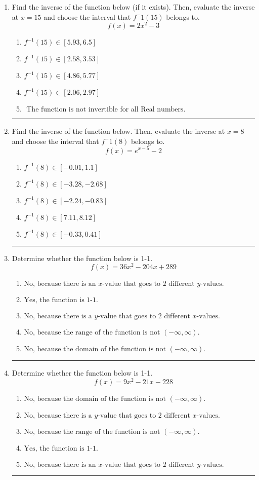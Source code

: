 \documentclass[14pt]{extbook}
\newcommand{\litem}[1]{\item#1\hspace*{-1cm}\rule{\textwidth}{0.4pt}}
\begin{document}
\begin{enumerate}
{\begin{enumerate}[label=\Alph*.]
\end{enumerate} }
\litem{
Find the inverse of the function below (if it exists). Then, evaluate the inverse at $x = 15$ and choose the interval that $f^-1(15)$ belongs to.\[ f(x) = 2 x^2 - 3 \]\begin{enumerate}[label=\Alph*.]
\item \( f^{-1}(15) \in [5.93, 6.5] \)
\item \( f^{-1}(15) \in [2.58, 3.53] \)
\item \( f^{-1}(15) \in [4.86, 5.77] \)
\item \( f^{-1}(15) \in [2.06, 2.97] \)
\item \( \text{ The function is not invertible for all Real numbers. } \)

\end{enumerate} }
\litem{
Find the inverse of the function below. Then, evaluate the inverse at $x = 8$ and choose the interval that $f^-1(8)$ belongs to.\[ f(x) = e^{x-5}-2 \]\begin{enumerate}[label=\Alph*.]
\item \( f^{-1}(8) \in [-0.01, 1.1] \)
\item \( f^{-1}(8) \in [-3.28, -2.68] \)
\item \( f^{-1}(8) \in [-2.24, -0.83] \)
\item \( f^{-1}(8) \in [7.11, 8.12] \)
\item \( f^{-1}(8) \in [-0.33, 0.41] \)

\end{enumerate} }
\litem{
Determine whether the function below is 1-1.\[ f(x) = 36 x^2 - 204 x + 289 \]\begin{enumerate}[label=\Alph*.]
\item \( \text{No, because there is an $x$-value that goes to 2 different $y$-values.} \)
\item \( \text{Yes, the function is 1-1.} \)
\item \( \text{No, because there is a $y$-value that goes to 2 different $x$-values.} \)
\item \( \text{No, because the range of the function is not $(-\infty, \infty)$.} \)
\item \( \text{No, because the domain of the function is not $(-\infty, \infty)$.} \)

\end{enumerate} }
\litem{
Determine whether the function below is 1-1.\[ f(x) = 9 x^2 - 21 x - 228 \]\begin{enumerate}[label=\Alph*.]
\item \( \text{No, because the domain of the function is not $(-\infty, \infty)$.} \)
\item \( \text{No, because there is a $y$-value that goes to 2 different $x$-values.} \)
\item \( \text{No, because the range of the function is not $(-\infty, \infty)$.} \)
\item \( \text{Yes, the function is 1-1.} \)
\item \( \text{No, because there is an $x$-value that goes to 2 different $y$-values.} \)


\end{enumerate}}
\end{enumerate}
\end{document}
